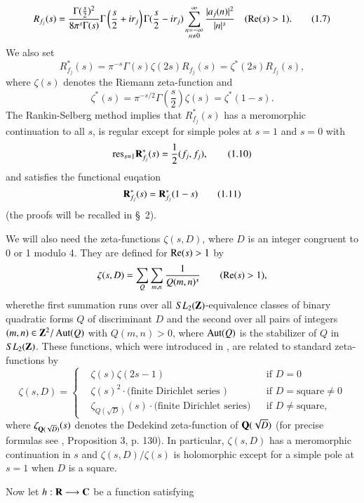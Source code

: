 \begin{equation*}
R_{f_j} (s) = \frac{\Gamma (\frac{s}{2})^2}{8 \pi^s \Gamma (s)} \Gamma \left(\frac{s}{2} + ir_j \right) \Gamma (\frac{s}{2} - ir_j ) \sum\limits^\infty_{\substack{n = -\infty\\ n \neq 0}} \frac{|a_j (n)|^2}{|n|^s} \quad (\operatorname{Re}(s) > 1).
\tag{1.7}\label{art11-eq1.7}
\end{equation*}
We also set 
\begin{equation*}
R^{\ast}_{f_j}(s) = \pi^{-s} \Gamma (s) \zeta (2s) R_{f_j} (s) = \zeta^\ast (2s) R_{f_j} (s), \tag{1.8}\label{art11-eq1.8}
\end{equation*}
where $\zeta(s)$ denotes the Riemann zeta-function and 
\begin{equation*}
\zeta^\ast (s) = \pi^{-s/2} \Gamma \left(\frac{s}{2} \right) \zeta(s) = \zeta^\ast (1-s). \tag{1.9}\label{art11-eq1.9}
\end{equation*}
The Rankin-Selberg method implies that $R^\ast_{f_j}(s)$ has a meromorphic continuation to all $s$, is regular except for simple poles at $s =1$ and $s =0$ with 
\begin{equation*}
\mathrm{res}_{s=1}  \mathbf{R}^\ast_{f_j} (s) = \frac{1}{2} (f_j, f_j), \tag{1.10}\label{art11-eq1.10}
\end{equation*}
and satisfies the functional euqation
\begin{equation*}
\mathbf{R}^\ast_{f_j} (s) = \mathbf{R}^\ast_{f_j} (1-s) \tag{1.11}\label{art11-eq1.11}
\end{equation*}
(the proofs will be recalled in \S~2).

We will also need the zeta-functions $\zeta(s,D)$, where $D$ is an integer congruent to 0 or 1 modulo 4. They are defined for $\operatorname{Re} (s) >1$ by
\begin{equation*}
\zeta(s, D) = \sum\limits_{Q} \sum\limits_{m,n} \frac{1}{Q(m,n)^s} \qquad (\operatorname{Re} (s) >1), \label{art11-eq1.12}
\end{equation*}
where\pageoriginale the first summation runs over all $SL_2 (\mathbf{Z})$-equivalence classes of binary quadratic forms $Q$ of discriminant $D$ and the second over all pairs of integers $(m,n) \in \mathbf{Z}^2 / \operatorname{Aut} (Q)$ with $Q(m,n) >0$, where $\operatorname{Aut} (Q)$ is the stabilizer of $Q$ in $SL_2 (\mathbf{Z})$. These functions, which were introduced in \cite{art11-10}, are related to standard zeta-functions by 
\begin{equation*}
\zeta (s,D) = 
\left\{ 
\begin{aligned}
&\zeta(s) \zeta(2s -1) & & \text{if  }D = 0\\
& \zeta(s)^2  \cdot \text{(finite Dirichlet series )}&&\text{if } D = \text{square} \neq 0\\
& \zeta_{Q (\sqrt{D})} (s) \cdot \text{(finite Dirichlet series)}& & \text{if } D \neq \text{square,}
\end{aligned}
\right.
\tag{1.13}\label{art11-eq1.13}
\end{equation*}
where $\zeta_{\mathbf{Q}(\sqrt{D})} (s)$  denotes the Dedekind zeta-function of $\mathbf{Q} (\sqrt{D})$ (for precise formulas see \cite{art11-10}, Proposition 3, p. 130). In particular, $\zeta(s,D)$ has a meromorphic continuation in $s$ and $\zeta(s,D)/ \zeta(s)$ is holomorphic except for a simple pole at $s =1$ when $D$ is a square. 

Now let $h : \mathbf{R} \longrightarrow \mathbf{C}$ be a function satisfying 




